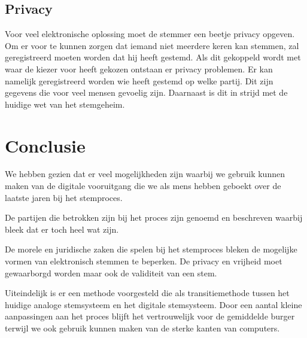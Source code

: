 \documentclass[a4paper]{article}
\newcommand{\TODO}[1]{{\color{red}\textbf{TODO: #1}}}
\renewcommand{\TODO}[1]{}
\begin{document}
\subsection{Privacy}
Voor veel elektronische oplossing moet de stemmer een beetje privacy opgeven.
Om er voor te kunnen zorgen dat iemand niet meerdere keren kan stemmen, zal geregistreerd moeten worden dat hij heeft gestemd. 
Als dit gekoppeld wordt met waar de kiezer voor heeft gekozen ontstaan er privacy problemen.
Er kan namelijk geregistreerd worden wie heeft gestemd op welke partij. 
Dit zijn gegevens die voor veel mensen gevoelig zijn.
Daarnaast is dit in strijd met de huidige wet van het stemgeheim.

\newpage

\section{Conclusie}
We hebben gezien dat er veel mogelijkheden zijn waarbij we gebruik kunnen maken van de digitale vooruitgang die we als mens hebben geboekt over de laatste jaren bij het stemproces. 

De partijen die betrokken zijn bij het proces zijn genoemd en beschreven waarbij bleek dat er toch heel wat zijn. 

De morele en juridische zaken die spelen bij het stemproces bleken de mogelijke vormen van elektronisch stemmen te beperken. De privacy en vrijheid moet gewaarborgd worden maar ook de validiteit van een stem. 

Uiteindelijk is er een methode voorgesteld die als transitiemethode tussen het huidige analoge stemsysteem en het digitale stemsysteem. Door een aantal kleine aanpassingen aan het proces blijft het vertrouwelijk voor de gemiddelde burger terwijl we ook gebruik kunnen maken van de sterke kanten van computers. 
\TODO{checky check}


\renewcommand\refname{Literatuur}

\end{document}
